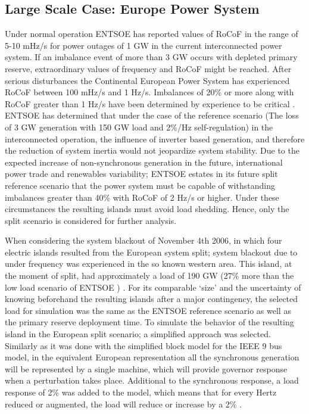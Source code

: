 \subsection{Large Scale Case: Europe Power System}

Under normal operation ENTSOE has reported values of RoCoF in the range of 5-10 mHz/s for power outages of 1 GW in the current interconnected power system. If an imbalance event of more than 3 GW occurs with depleted primary reserve, extraordinary values of frequency and RoCoF might be reached. After serious disturbances the Continental European Power System has experienced RoCoF between 100 mHz/s and 1 Hz/s. Imbalances of 20\% or more along with RoCoF greater than 1 Hz/s have been determined by experience to be critical \cite{ENTSOE.2016}.
ENTSOE has determined that under the case of the reference scenario (The loss of 3 GW generation with 150 GW load and 2\%/Hz self-regulation) in the interconnected operation, the influence of inverter based generation, and therefore the reduction of system inertia would not jeopardize system stability. Due to the expected increase of non-synchronous generation in the future, international power trade and renewables variability; ENTSOE estates in its future split reference scenario that the power system must be capable of withstanding imbalances greater than 40\% with RoCoF of 2 Hz/s or higher. Under these circumstances the resulting islands must avoid load shedding. Hence, only the split scenario is considered for further analysis.

When considering the system blackout of November 4th 2006, in which four electric islands resulted from the European system split; system blackout due to under frequency was experienced in the so known western area. This island, at the moment of split, had approximately a load of 190 GW (27\% more than the low load scenario of ENTSOE ) \cite{ucte2007final}. For its comparable `size’ and the uncertainty of knowing beforehand the resulting islands after a major contingency, the selected load for simulation was the same as the ENTSOE reference scenario as well as the primary reserve deployment time. To simulate the behavior of the resulting island in the European split scenario; a simplified approach was selected. Similarly as it was done with the simplified block model for the IEEE 9 bus model, in the equivalent European representation all the synchronous generation will be represented by a single machine, which will provide governor response when a perturbation takes place. Additional to the synchronous response, a load response of 2\% was added to the model, which means that for every Hertz reduced or augmented, the load will reduce or increase by a 2\% \cite{ENTSOE.2016}. \\
 
